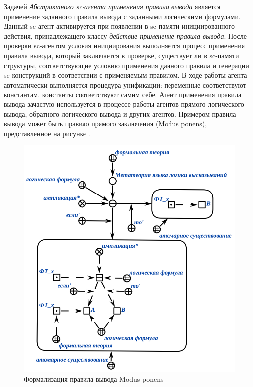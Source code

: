 Задачей \textit{Абстрактного sc-агента применения правила вывода} является применение заданного правила вывода с заданными логическими формулами. Данный sc-агент активируется при появлении в sc-памяти инициированного действия, принадлежащего классу \textit{действие применение правила вывода}. После проверки sc-агентом условия инициирования выполняется процесс применения правила вывода, который заключается в  проверке, существует ли в sc-памяти структуры, соответствующие условию применения данного правила и генерации sc-конструкций в соответствии с применяемым правилом. В ходе работы агента автоматически выполняется процедура унификации: переменные соответствуют константам, константы соответствуют самим себе. Агент применения правила вывода зачастую используется в процессе работы агентов прямого логического вывода, обратного логического вывода и других агентов. Примером правила вывода может быть правило прямого заключения (Modus ponens), представленное на рисунке \textit{}.

\begin{figure}[http]
	\includegraphics[scale=0.8]{author/part3/figures/Modus_ponens.png}
	\caption{Формализация правила вывода Modus ponens}
	\label{fig:modus_ponens_formalization}
\end{figure}

